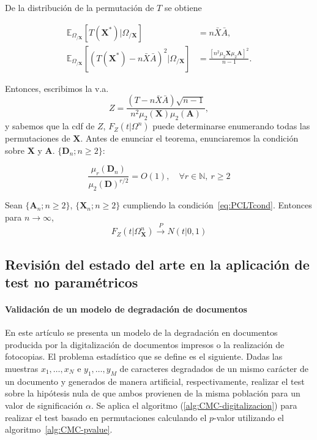 	De la distribución de la permutación de $T$ se obtiene

\begin{align*}
	\mathbb{E}_{\Omega_{/\mathbf{X}}} \left[
		T(\mathbf{X}^*) | \Omega_{/\mathbf{X}}
		\right] &=
		n \bar{X} \bar{A}, \\
	\mathbb{E}_{\Omega_{/\mathbf{X}}} \left[
		(T(\mathbf{X}^*) - n\bar{X}\bar{A})^2 | 
			\Omega_{/\mathbf{X}}
		\right] &=
		\frac{[n^2 \mu_2{\mathbf{X}} \mu_2{\mathbf{A}}]^2}
			{n-1}.
\end{align*}

	Entonces, escribimos la v.a.
	\[
		Z = \frac{(T - n \bar{X} \bar{A})\sqrt{n-1}}
				{n^2 \mu_2(\mathbf{X}) \mu_2(\mathbf{A})},
	\]
	y sabemos que la cdf de $Z$, $F_Z(t|\Omega^n)$ puede 
determinarse enumerando todas las permutaciones de 
$\mathbf{X}$. Antes de enunciar el teorema, enunciaremos la 
condición sobre $\mathbf{X}$ y $\mathbf{A}$. 
$\{ \mathbf{D}_n; n \geq 2 \}$:

\begin{equation}
	 \label{eq:PCLTcond}
	 \tag{C.1}
	 \frac{\mu_r(\mathbf{D}_n)}
	 		{\mu_2(\mathbf{D})^{r/2}} = O(1),\quad
	 		\forall r \in \mathbb{N},\ r \geq 2
\end{equation}

\begin{teorema}
	Sean $\{\mathbf{A}_n; n \geq 2\}$, $\{\mathbf{X}_n; 
n \geq 2\}$ cumpliendo la condición~\ref{eq:PCLTcond}. 
Entonces para $n \rightarrow \infty$,
	\[ F_Z(t | \Omega^n_{\mathbf{X}}) 
		\overset{P}{\rightarrow} \mathit{N}(t | 0,1)
	\]
	\label{th:PCTL}
\end{teorema}

\subsection{Revisión del estado del arte en la aplicación de test no paramétricos}
 
\paragraph{Validación de un modelo de degradación de 
documentos} \cite{KANUNGO00} En este artículo se presenta un 
modelo de la degradación en documentos producida por la 
digitalización de documentos impresos o la realización de 
fotocopias. El problema estadístico que se define es el 
siguiente. Dadas las muestras $x_1, \dots, x_N$ e $y_1, 
\dots, y_M$ de caracteres degradados de un mismo carácter de 
un documento y generados de manera artificial, 
respectivamente, realizar el test sobre la hipótesis nula de 
que ambos  provienen de la misma población para un valor de 
significación $\alpha$. Se aplica el algoritmo 
(\ref{alg:CMC-digitalizacion}) para realizar el test basado 
en permutaciones calculando el $p$-valor utilizando el 
algoritmo~\ref{alg:CMC-pvalue}.

